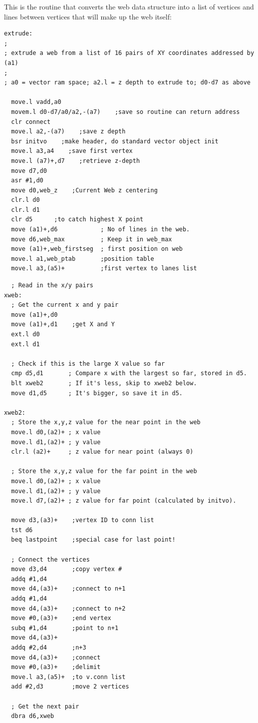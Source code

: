 This is the routine that converts the web data structure into a list of vertices and lines between vertices
that will make up the web itself:

\begin{lstlisting}
extrude:
;
; extrude a web from a list of 16 pairs of XY coordinates addressed by (a1)
;
; a0 = vector ram space; a2.l = z depth to extrude to; d0-d7 as above

  move.l vadd,a0
  movem.l d0-d7/a0/a2,-(a7)    ;save so routine can return address
  clr connect
  move.l a2,-(a7)    ;save z depth
  bsr initvo    ;make header, do standard vector object init
  move.l a3,a4    ;save first vertex
  move.l (a7)+,d7    ;retrieve z-depth
  move d7,d0
  asr #1,d0
  move d0,web_z    ;Current Web z centering
  clr.l d0
  clr.l d1
  clr d5      ;to catch highest X point
  move (a1)+,d6            ; No of lines in the web.
  move d6,web_max          ; Keep it in web_max
  move (a1)+,web_firstseg  ; first position on web
  move.l a1,web_ptab       ;position table
  move.l a3,(a5)+          ;first vertex to lanes list
\end{lstlisting}

\begin{lstlisting}
  ; Read in the x/y pairs
xweb:
  ; Get the current x and y pair
  move (a1)+,d0
  move (a1)+,d1    ;get X and Y
  ext.l d0
  ext.l d1

  ; Check if this is the large X value so far
  cmp d5,d1       ; Compare x with the largest so far, stored in d5. 
  blt xweb2       ; If it's less, skip to xweb2 below.
  move d1,d5      ; It's bigger, so save it in d5.

xweb2:
  ; Store the x,y,z value for the near point in the web
  move.l d0,(a2)+ ; x value
  move.l d1,(a2)+ ; y value
  clr.l (a2)+     ; z value for near point (always 0)

  ; Store the x,y,z value for the far point in the web
  move.l d0,(a2)+ ; x value
  move.l d1,(a2)+ ; y value
  move.l d7,(a2)+ ; z value for far point (calculated by initvo).

  move d3,(a3)+    ;vertex ID to conn list
  tst d6
  beq lastpoint    ;special case for last point!

  ; Connect the vertices
  move d3,d4       ;copy vertex #
  addq #1,d4
  move d4,(a3)+    ;connect to n+1
  addq #1,d4
  move d4,(a3)+    ;connect to n+2
  move #0,(a3)+    ;end vertex 
  subq #1,d4       ;point to n+1
  move d4,(a3)+
  addq #2,d4       ;n+3
  move d4,(a3)+    ;connect
  move #0,(a3)+    ;delimit
  move.l a3,(a5)+  ;to v.conn list
  add #2,d3        ;move 2 vertices

  ; Get the next pair
  dbra d6,xweb
\end{lstlisting}

